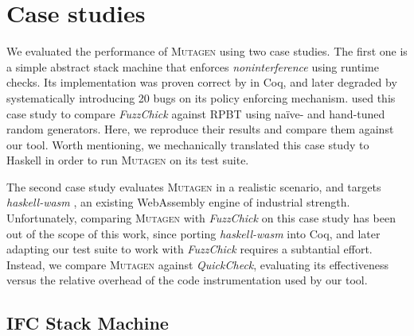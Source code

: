 \documentclass[sigconf,review,anonymous]{acmart}
\newcommand{\quickcheck}{\textit{QuickCheck}\xspace}
\newcommand{\fuzzchick}{\textit{FuzzChick}\xspace}
\newcommand{\mutagen}{\textsc{Mutagen}\xspace}
\begin{document}




\section{Case studies}
\label{sec:casestudies}

We evaluated the performance of \mutagen using two case studies.
%
The first one is a simple abstract stack machine that enforces
\emph{noninterference} \cite{goguen1982security} using runtime checks.
%
Its implementation was proven correct by \citeauthor{10.1145/2578855.2535839}
\citeyearpar{10.1145/2578855.2535839} in Coq, and later degraded by
systematically introducing 20 bugs on its policy enforcing mechanism.
%
\citeauthor{lampropoulos2019coverage} used this case study to compare \fuzzchick
against RPBT using na\"ive- and hand-tuned random generators.
%
Here, we reproduce their results and compare them against our tool.
%
Worth mentioning, we mechanically translated this case study to Haskell in order
to run \mutagen on its test suite.


The second case study evaluates \mutagen in a realistic scenario, and targets
\textit{haskell-wasm} \cite{haskellwasm}, an existing WebAssembly engine of
industrial strength.
%
%
Unfortunately, comparing \mutagen with \fuzzchick on this case study has been
out of the scope of this work, since porting \textit{haskell-wasm} into Coq, and
later adapting our test suite to work with \fuzzchick requires a subtantial
effort.
%
Instead, we compare \mutagen against \quickcheck, evaluating its effectiveness
versus the relative overhead of the code instrumentation used by our tool.



\subsection{IFC Stack Machine}
\end{document}
